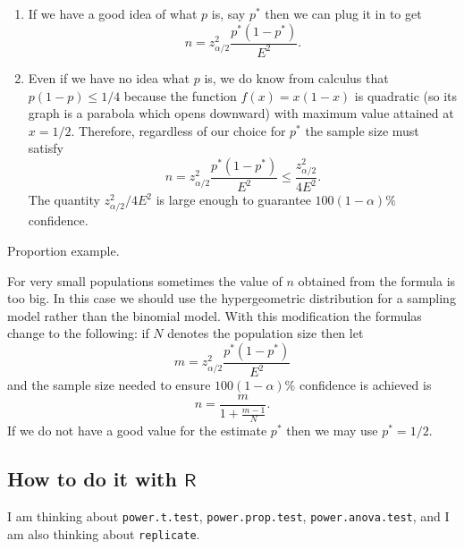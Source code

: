 \documentclass[captions=tableheading]{scrbook}
\begin{document}
\begin{enumerate}
\item If we have a good idea of what \(p\) is, say \(p^{\ast}\) then we can plug it in to get
   \begin{equation}
   n=z_{\alpha/2}^{2}\frac{p^{\ast}(1-p^{\ast})}{E^{2}}.
   \end{equation}
\item Even if we have no idea what \(p\) is, we do know from calculus that \(p(1-p)\leq1/4\) because the function \(f(x)=x(1-x)\) is quadratic (so its graph is a parabola which opens downward) with maximum value attained at \(x=1/2\). Therefore, regardless of our choice for \(p^{\ast}\) the sample size must satisfy
   \begin{equation}
   n=z_{\alpha/2}^{2}\frac{p^{\ast}(1-p^{\ast})}{E^{2}}\leq\frac{z_{\alpha/2}^{2}}{4E^{2}}.
   \end{equation}
   The quantity \(z_{\alpha/2}^{2}/4E^{2}\) is large enough to guarantee \(100(1-\alpha)\%\) confidence.
\end{enumerate}

\begin{example}
Proportion example.
\end{example}

\begin{rem}
For very small populations sometimes the value of \(n\) obtained from the formula is too big. In this case we should use the hypergeometric distribution for a sampling model rather than the binomial model. With this modification the formulas change to the following: if \(N\) denotes the population size then let
\begin{equation}
m=z_{\alpha/2}^{2}\frac{p^{\ast}(1-p^{\ast})}{E^{2}}
\end{equation}
and the sample size needed to ensure \(100(1-\alpha)\%\) confidence is achieved is
\begin{equation}
n=\frac{m}{1+\frac{m-1}{N}}.
\end{equation}
If we do not have a good value for the estimate \(p^{\ast}\) then we may use \(p^{\ast}=1/2\).
\end{rem}
\subsection{How to do it with \(\mathsf{R}\)}
\label{sec-9-7-1}

I am thinking about \texttt{power.t.test}, \texttt{power.prop.test}, \texttt{power.anova.test}, and I am also thinking about \texttt{replicate}.
\end{document}

